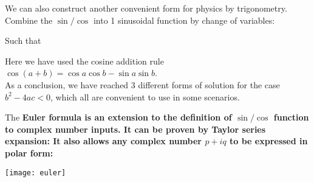 \documentclass[class=article, crop=false, 12pt]{standalone}
\begin{document}
We can also construct another convenient form for physics by trigonometry. 
Combine the $\sin/\cos$ into 1 sinusoidal function by change of variables:

Such that 

Here we have used the cosine addition rule $\cos{(a+b)} = \cos{a}\cos{b}-\sin{a}\sin{b}$.  \\

As a conclusion, we have reached 3 different forms of solution for the case $b^2-4ac<0$, 
which all are convenient to use in some scenarios.




\begin{notation}
    The \bf{Euler formula} is an extension to the definition of $\sin/\cos$ function to complex number inputs.
    It can be proven by Taylor series expansion:
    It also allows any complex number $p+iq$ to be expressed in polar form:
    \begin{minipage}{0.65\textwidth}
    \end{minipage}
    \begin{minipage}{0.33\textwidth}
        \texttt{[image: euler]}
    \end{minipage}

\end{notation}
\end{document}
